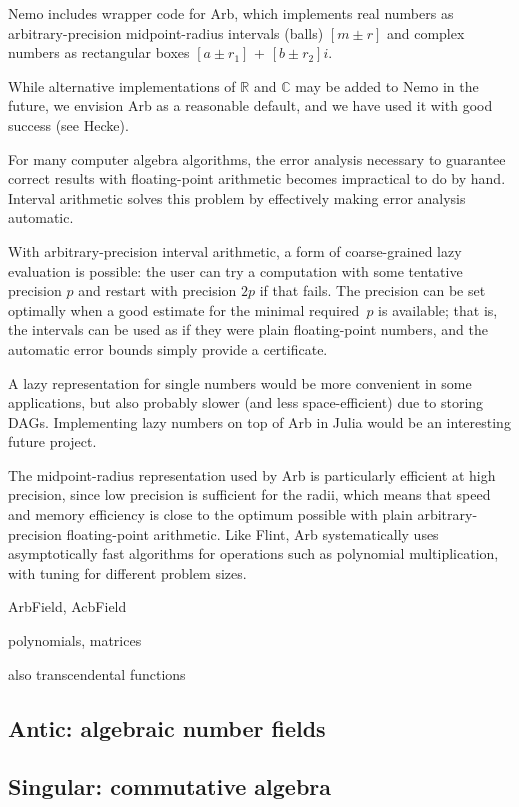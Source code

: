 \documentclass{sig-alternate-05-2015}
\begin{document}
Nemo includes wrapper code for Arb, which implements real numbers as
arbitrary-precision midpoint-radius intervals (balls) $[m \pm r]$
and complex numbers as rectangular boxes $[a \pm r_1]$ + $[b \pm r_2] i$.

While alternative implementations of $\mathbb{R}$ and $\mathbb{C}$
may be added to Nemo in the future, we envision Arb as a reasonable default,
and we have used it with good success (see Hecke).

For many computer algebra algorithms, the error analysis
necessary to guarantee correct results with floating-point arithmetic
becomes impractical to do by hand.
Interval arithmetic solves this problem by effectively making
error analysis automatic.

With arbitrary-precision interval arithmetic, a form of
coarse-grained lazy evaluation is possible: the user can
try a computation with some tentative precision $p$ and restart
with precision $2p$ if that fails. The precision can be set
optimally when a good estimate for the minimal
required~$p$ is available; that is, the intervals
can be used as if they were plain floating-point numbers, and the automatic
error bounds simply provide a certificate.

A lazy representation for single numbers would be more convenient in some
applications,
but also probably slower (and less space-efficient) due to storing DAGs.
Implementing lazy numbers on top of Arb in Julia
would be an interesting future project.

The midpoint-radius representation used by Arb is particularly efficient
at high precision,
since low precision is sufficient for the radii, which means that
speed and memory efficiency is close to the optimum possible
with plain arbitrary-precision floating-point arithmetic.
Like Flint, Arb systematically uses asymptotically fast algorithms
for operations such as polynomial multiplication, with tuning
for different problem sizes.


ArbField, AcbField

polynomials, matrices

also transcendental functions

\subsection{Antic: algebraic number fields}

\subsection{Singular: commutative algebra}
\end{document}
